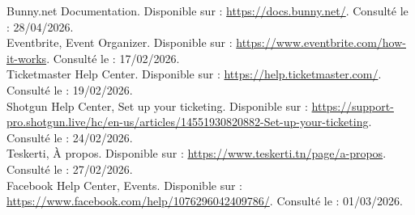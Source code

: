 \noindent [28] Bunny.net Documentation. Disponible sur : \url{https://docs.bunny.net/}. Consulté le : 28/04/2026.\\
\noindent [29] Eventbrite, Event Organizer. Disponible sur : \url{https://www.eventbrite.com/how-it-works}. Consulté le : 17/02/2026.\\
\noindent [30] Ticketmaster Help Center. Disponible sur : \url{https://help.ticketmaster.com/}. Consulté le : 19/02/2026.\\
\noindent [31] Shotgun Help Center, Set up your ticketing. Disponible sur : \url{https://support-pro.shotgun.live/hc/en-us/articles/14551930820882-Set-up-your-ticketing}. Consulté le : 24/02/2026.\\
\noindent [32] Teskerti, À propos. Disponible sur : \url{https://www.teskerti.tn/page/a-propos}. Consulté le : 27/02/2026.\\
\noindent [33] Facebook Help Center, Events. Disponible sur : \url{https://www.facebook.com/help/1076296042409786/}. Consulté le : 01/03/2026.
